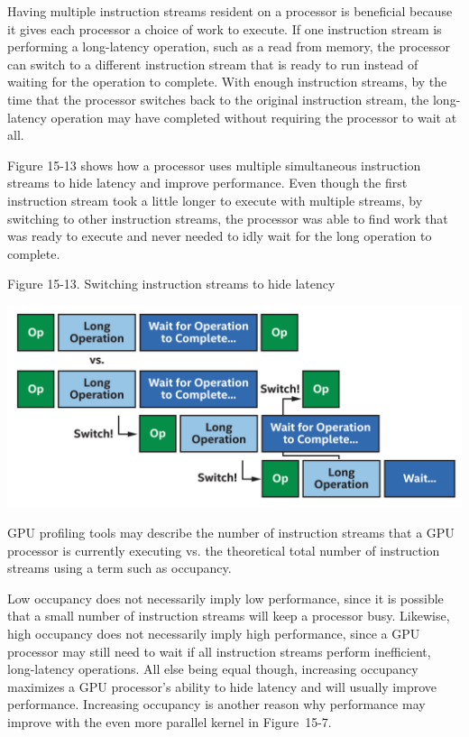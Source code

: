 Having multiple instruction streams resident on a processor is beneficial because it gives each processor a choice of work to execute. If one instruction stream is performing a long-latency operation, such as a read from memory, the processor can switch to a different instruction stream that is ready to run instead of waiting for the operation to complete. With enough instruction streams, by the time that the processor switches back to the original instruction stream, the long-latency operation may have completed without requiring the processor to wait at all.\par

Figure 15-13 shows how a processor uses multiple simultaneous instruction streams to hide latency and improve performance. Even though the first instruction stream took a little longer to execute with multiple streams, by switching to other instruction streams, the processor was able to find work that was ready to execute and never needed to idly wait for the long operation to complete.\par

\hspace*{\fill} \par %
Figure 15-13. Switching instruction streams to hide latency
\begin{center}
	\includegraphics[width=1.0\textwidth]{content/chapter-15/images/9}
\end{center}

GPU profiling tools may describe the number of instruction streams that a GPU processor is currently executing vs. the theoretical total number of instruction streams using a term such as occupancy.\par

Low occupancy does not necessarily imply low performance, since it is possible that a small number of instruction streams will keep a processor busy. Likewise, high occupancy does not necessarily imply high performance, since a GPU processor may still need to wait if all instruction streams perform inefficient, long-latency operations. All else being equal though, increasing occupancy maximizes a GPU processor’s ability to hide latency and will usually improve performance. Increasing occupancy is another reason why performance may improve with the even more parallel 
kernel in Figure 15-7.\par

